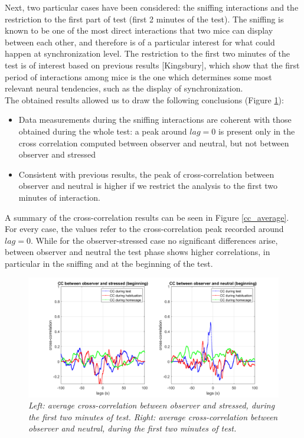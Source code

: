 \documentclass[12pt, a4paper]{article}
\begin{document}
Next, two particular cases have been considered: the sniffing interactions and the restriction to the first part of test (first 2 minutes of the test). The sniffing is known to be one of the most direct interactions that two mice can display between each other, and therefore is of a particular interest for what could happen at synchronization level. The restriction to the first two minutes of the test is of interest based on previous results [Kingsbury], which show that the first period of interactions among mice is the one which determines some most relevant neural tendencies, such as the display of synchronization.\\
The obtained results allowed us to draw the following conclusions (Figure \ref{initial}):

\begin{itemize}
	\item Data measurements during the sniffing interactions are coherent with those obtained during the whole test: a peak around $lag=0$ is present only in the cross correlation computed between observer and neutral, but not between observer and stressed
	
	\item Consistent with previous results, the peak of cross-correlation between observer and neutral is higher if we restrict the analysis to the first two minutes of interaction.
	
\end{itemize}

A summary of the cross-correlation results can be seen in Figure \ref{cc_average}. For every case, the values refer to the cross-correlation peak recorded around $lag=0$. While for the observer-stressed case no significant differences arise, between observer and neutral the test phase shows higher correlations, in particular in the sniffing and at the beginning of the test.



\begin{figure}[H]
	
	\begin{center}
		\hspace*{-1.4cm}
		\includegraphics[scale=.4]{average_cc_initial.png} 
	\end{center} 
	\caption{\textit{Left: average cross-correlation between observer and stressed, during the first two minutes of test. Right: average cross-correlation between observer and neutral, during the first two minutes of test.}}
	\label{initial}
\end{figure}
\end{document}
